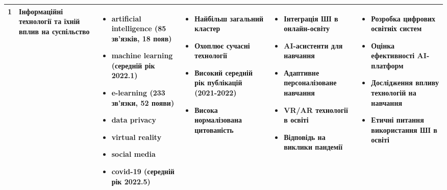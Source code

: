 {\begin{longtable}{|c|p{2.6cm}|p{3cm}|p{3.1cm}|p{3cm}|p{3cm}|}
\cellcolor{red!20}1 & 
\textbf{Інформаційні технології та їхній вплив на суспільство} & 
\begin{itemize}
    \item artificial intelligence (85 зв'язків, 18 появ)
    \item machine learning (середній рік 2022.1)
    \item e-learning (233 зв'язки, 52 появи)
    \item data privacy
    \item virtual reality
    \item social media
    \item covid-19 (середній рік 2022.5)
\end{itemize} & 
\begin{itemize}
    \item Найбільш загальний кластер
    \item Охоплює сучасні технології
    \item Високий середній рік публікацій (2021-2022)
    \item Висока нормалізована цитованість
\end{itemize} & 
\begin{itemize}
    \item Інтеграція ШІ в онлайн-освіту
    \item AI-асистенти для навчання
    \item Адаптивне персоналізоване навчання
    \item VR/AR технології в освіті
    \item Відповідь на виклики пандемії
\end{itemize} & 
\begin{itemize}
    \item Розробка цифрових освітніх систем
    \item Оцінка ефективності AI-платформ
    \item Дослідження впливу технологій на навчання
    \item Етичні питання використання ШІ в освіті
\end{itemize} \\
\hline


\end{longtable}}
